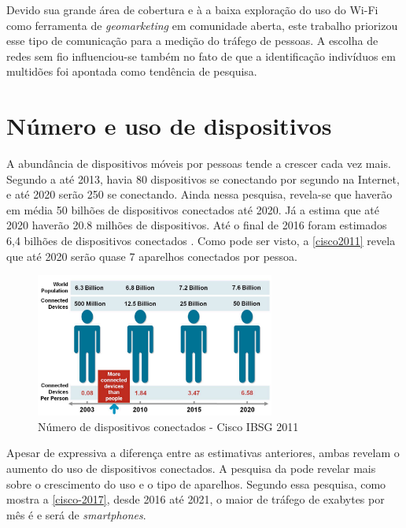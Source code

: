 Devido sua grande área de cobertura e à a baixa exploração do uso do Wi-Fi como ferramenta de \emph{geomarketing} em comunidade aberta, este trabalho priorizou esse tipo de comunicação para a medição do tráfego de pessoas. A escolha de redes sem fio influenciou-se também no fato de que a identificação indivíduos em multidões foi apontada como tendência de pesquisa.


\section{Número e uso de dispositivos}

A abundância de dispositivos móveis por pessoas tende a crescer cada vez mais. Segundo a  até 2013, havia 80 dispositivos
se conectando por segundo na Internet, e até 2020 serão 250 se conectando. Ainda nessa pesquisa, revela-se que haverão em média
50 bilhões de dispositivos conectados até 2020. Já a  estima que até 2020 haverão 20.8 milhões de dispositivos.
Até o final de 2016 foram estimados 6,4 bilhões de dispositivos conectados \cite{Gartner2014}. Como pode ser visto, a \autoref{cisco2011}
revela que até 2020 serão quase 7 aparelhos conectados por pessoa.

\begin{figure}[htb]
  \caption{\label{cisco2011}Número de dispositivos conectados - Cisco IBSG 2011}
  \begin{center}
    \includegraphics[width=0.70\textwidth]{img/cisco-2011.png}
  \end{center}
\end{figure}

Apesar de expressiva a diferença entre as estimativas anteriores, ambas revelam o aumento do uso de dispositivos conectados.
A pesquisa da  pode revelar mais sobre o crescimento do uso e o tipo de aparelhos. Segundo essa pesquisa,
como mostra a \autoref{cisco-2017}, desde
2016 até 2021, o maior de tráfego de exabytes por mês é e será de \emph{smartphones}.


